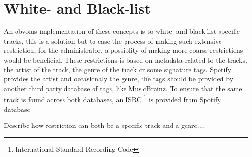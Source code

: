 \section{White- and Black-list}

An obvoius implementation of these concepts is to white- and black-list specific tracks, this is a solution but to ease the process of making such extensive restriction, for the administrator, a possiblity of making more coarse restrictions would be beneficial. These restrictions is based on metadata related to the tracks, the artist of the track, the genre of the track or some signature tags. Spotify provides the artist and occasionaly the genre, the tags should be provided by another third party database of tags, like MusicBrainz. To ensure that the same track is found across both databases, an ISRC \footnote{International Standard Recording Code\cite{isrc}} is provided from Spotify database.

Describe how restriction can both be a specific track and a genre....